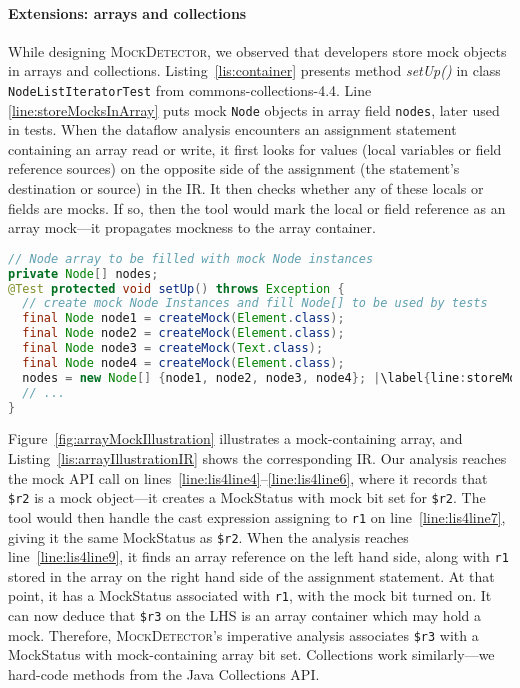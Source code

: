 \paragraph{Extensions: arrays and collections} While designing \textsc{MockDetector}, we observed that developers store mock objects in arrays and collections. Listing~\ref{lis:container} presents method \textit{setUp()} in class \texttt{NodeListIteratorTest} from commons-collections-4.4. Line \ref{line:storeMocksInArray} puts mock \texttt{Node} objects in array field \texttt{nodes}, later used in tests. When the dataflow analysis encounters an assignment statement containing an array read or write, it first looks for values (local variables or field reference sources) on the opposite side of the assignment (the statement's destination or source) in the IR. It then checks whether any of these locals or fields are mocks. If so, then the tool would mark the local or field reference as an array mock---it propagates mockness to the array container.

\begin{lstlisting}[basicstyle=\ttfamily, caption={This example illustrates a field array container holding mock objects from \textit{setUp()} in \texttt{NodeListIteratorTest}.},
basicstyle=\scriptsize\ttfamily,language = Java, framesep=4.5mm, framexleftmargin=1.0mm, captionpos=b, label=lis:container, escapechar=|, morekeywords={@Test}]
// Node array to be filled with mock Node instances
private Node[] nodes;
@Test protected void setUp() throws Exception {
  // create mock Node Instances and fill Node[] to be used by tests
  final Node node1 = createMock(Element.class);
  final Node node2 = createMock(Element.class);
  final Node node3 = createMock(Text.class);
  final Node node4 = createMock(Element.class);
  nodes = new Node[] {node1, node2, node3, node4}; |\label{line:storeMocksInArray}|
  // ...
}
\end{lstlisting}

Figure~\ref{fig:arrayMockIllustration} illustrates a mock-containing array, and Listing~\ref{lis:arrayIllustrationIR} shows the corresponding IR. Our analysis reaches the mock API call on lines~\ref{line:lis4line4}--\ref{line:lis4line6}, where it records that \texttt{\$r2} is a mock object---it creates a MockStatus with mock bit set for \texttt{\$r2}. The tool would then handle the cast expression assigning to \texttt{r1} on line~\ref{line:lis4line7}, giving it the same MockStatus as \texttt{\$r2}. When the analysis reaches line~\ref{line:lis4line9}, it finds an array reference on the left hand side, along with \texttt{r1} stored in the array on the right hand side of the assignment statement. At that point, it has a MockStatus associated with \texttt{r1}, with the mock bit turned on. It can now deduce that \texttt{\$r3} on the LHS is an array container which may hold a mock. Therefore, \textsc{MockDetector}'s imperative analysis associates \texttt{\$r3} with a MockStatus with mock-containing array bit set. Collections work similarly---we hard-code methods from the Java Collections API.

